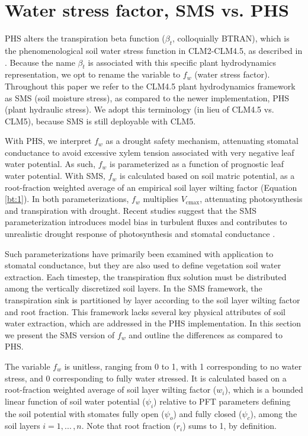\documentclass[draft,linenumbers]{agujournal}
\begin{document}
\section{Water stress factor, SMS vs. PHS}
\label{sect:btran}
    PHS alters the transpiration beta function ($\beta_t$, colloquially BTRAN), 
    which is the phenomenological soil water stress function in CLM2-CLM4.5, as described in \citet{oleson2013}.
    Because the name $\beta_t$ is associated with this specific plant hydrodynamics representation, we opt to rename the variable to $f_w$ (water stress factor).
    Throughout this paper we refer to the CLM4.5 plant hydrodynamics framework as SMS (soil moisture stress), 
    as compared to the newer implementation, PHS (plant hydraulic stress).
    We adopt this terminology (in lieu of CLM4.5 vs. CLM5), because SMS is still deployable with CLM5. 
    
    With PHS, we interpret $f_w$ as a drought safety mechanism, attenuating stomatal conductance to avoid
    excessive xylem tension associated with very negative leaf water potential.
    As such, $f_w$ is parameterized as a function of prognostic leaf water potential.
    With SMS, $f_w$ is calculated based on soil matric potential, 
    as a root-fraction weighted average of an empirical soil layer wilting factor (Equation \ref{bt:1}).
    In both parameterizations, $f_w$ multiplies $V_{\text{cmax}}$, attenuating photosynthesis and transpiration with drought.
    Recent studies suggest that the SMS parameterization introduces model bias in turbulent fluxes \citep{bonan2014}
    and contributes to unrealistic drought response of photosynthesis and stomatal conductance \citep{powell2013}.

    
    Such parameterizations have primarily been examined with application to stomatal conductance, but they are also used to define vegetation soil water extraction. 
    Each timestep, the transpiration flux solution must be distributed among the vertically discretized soil layers.
    In the SMS framework, the transpiration sink is partitioned by layer according to the soil layer wilting factor and root fraction.
    This framework lacks several key physical attributes of soil water extraction, which are addressed in the PHS implementation.
    In this section we present the SMS version of $f_w$ and outline the differences as compared to PHS.
    
    The variable $f_w$ is unitless, ranging from 0 to 1, with 1 corresponding to no water stress, and 0 corresponding to fully water stressed. 
    It is calculated based on a root-fraction weighted average of soil layer wilting factor ($w_i$), which is a bounded linear 
    function of soil water potential ($\psi_i$) relative to PFT parameters defining the soil potential with stomates fully open ($
    \psi_{o}$) and fully closed ($\psi_{c}$), among the soil layers $i=1,...\,,n$. Note that root fraction ($r_i$) sums to 1, by definition.
    
\end{document}
